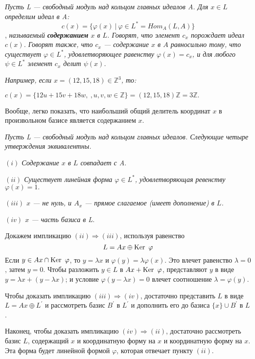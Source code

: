 \begin{determ}
\hspace*{0.5cm}

\textit{ Пусть L — свободный модуль над кольцом главных идеалов A. Для $x \in L$ определим идеал в A:}
$$ c(x) = \{\varphi(x)~|~\varphi \in L^{*} = Hom_{A} (L, A)\}$$,
\noindent \textit{ называемый \textbf{содержанием} $x$ в $L$. Говорят, что элемент $c_x$ порождает идеал $c(x)$. Говорят также, что $c_x$ — содержание $x$ в $A$ равносильно тому, что существует $\varphi \in L^{*}$, удовлетворяющее равенству $ \varphi(x) = c_x$, и для любого $\psi \in L^{*}$ элемент $c_x$  делит $\psi (x)$.}

\textit{Например, если $x = (12, 15, 18) \in \mathbb{Z}^{3}$, то:}
\begin{center}
$c(x) = \{12u + 15v + 18w,~,u,v,w \in \mathbb{Z}\} = $$(12, 15, 18) \mathbb{Z} = 3\mathbb{Z}.$
\end{center}

Вообще, легко показать, что наибольший общий делитель координат $x$ в произвольном базисе является содержанием $x$.
\end{determ}
\begin{lemma}

\hspace*{0.5cm}

\textit{Пусть L — свободный модуль над кольцом главных идеалов. Следующие четыре утверждения эквивалентны.}

\textit{$(i)$ Содержание $x$ в $L$ совпадает с A}.

\textit{$(ii)$ Существует линейная форма $ \varphi \in L^{*}$, удовлетворяющая ревенству $\varphi(x) = 1.$}

\textit{$(iii)$ $x$ — не нуль, и $A_x$ — прямое слагаемое (имеет дополнение) в $L$.}

\textit{$(iv)$ $x$ — часть базиса в L.}\\
\end{lemma}
\begin{myproof}
Докажем импликацию $(ii) \Rightarrow (iii)$, используя равенство
$$ L = Ax \oplus \operatorname{Ker}~\varphi$$ Если $y \in Ax \cap \operatorname{Ker}~\varphi$, то $y= \lambda x$ и $\varphi(y) = \lambda \varphi(x)$. Это влечет равенство $ \lambda = 0$, затем $y = 0$. Чтобы разложить $ y \in L$ в $Ax + \operatorname{Ker}~ \varphi$, представляют $y$ в виде $y = \lambda x + (y - \lambda x)$; и условие $\varphi(y - \lambda x) = 0$ влечет соотношение $\lambda = \varphi(y)$.

\noindent Чтобы доказать импликацию $(iii) \Rightarrow (iv)$, достаточно представить $L$ в виде $L = Ax \oplus L^{'}$ и рассмотреть базис $B^{'}$ в $L^{'}$ и дополнить его до базиса $\{x\} \cup B^{'}$ в $L$.

\noindent Наконец, чтобы доказать импликацию $(iv) \Rightarrow (ii)$, достаточно рассмотреть базис $L$, содержащий $x$ и координатную форму на $x$ и координатную форму на $x$. Эта форма будет линейной формой $\varphi$, которая отвечает пункту $(ii)$.
\end{myproof}

